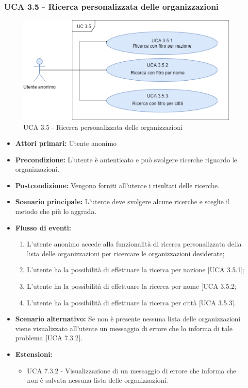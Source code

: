 \subsubsection{UCA 3.5 - Ricerca personalizzata delle organizzazioni}%
\begin{figure}[h]
	\centering
	
	\includegraphics[scale=0.5]{sezioni/UseCase/Immagini/UCA3.5.png}
	\caption{UCA 3.5 - Ricerca personalizzata delle organizzazioni}
\end{figure}
\begin{itemize}
	\item \textbf{Attori primari:} Utente anonimo
	\item \textbf{Precondizione:} L'utente è autenticato e può svolgere ricerche riguardo le organizzazioni.
	\item \textbf{Postcondizione:} Vengono forniti all'utente i risultati delle ricerche.
	\item \textbf{Scenario principale:} L'utente deve svolgere alcune ricerche e sceglie il metodo che più lo aggrada.
	\item \textbf{Flusso di eventi:} 
	\begin{enumerate}
		\item L'utente anonimo accede alla funzionalità di ricerca personalizzata della lista delle organizzazioni per ricercare le organizzazioni desiderate;
		\item L'utente ha la possibilità di effettuare la ricerca per nazione [UCA 3.5.1];
		\item L'utente ha la possibilità di effettuare la ricerca per nome [UCA 3.5.2;
		\item L'utente ha la possibilità di effettuare la ricerca per città [UCA 3.5.3].
	\end{enumerate}
	\item \textbf{Scenario alternativo:} Se non è presente nessuna lista delle organizzazioni viene visualizzato all'utente un messaggio di errore che lo informa di tale problema [UCA 7.3.2].
	\item \textbf{Estensioni:}
	\begin{itemize}
		\item UCA 7.3.2 - Visualizzazione di un messaggio di errore che informa che non è salvata nessuna lista delle organizzazioni.
	\end{itemize}
\end{itemize}

